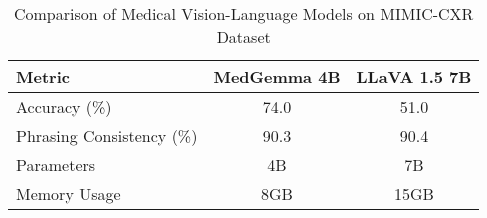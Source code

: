 \begin{table}[h]
\centering
\caption{Comparison of Medical Vision-Language Models on MIMIC-CXR Dataset}
\begin{tabular}{lcc}
\hline
\textbf{Metric} & \textbf{MedGemma 4B} & \textbf{LLaVA 1.5 7B} \\
\hline
Accuracy (\%) & 74.0 & 51.0 \\
Phrasing Consistency (\%) & 90.3 & 90.4 \\
Parameters & 4B & 7B \\
Memory Usage & 8GB & 15GB \\
\hline
\end{tabular}
\end{table}